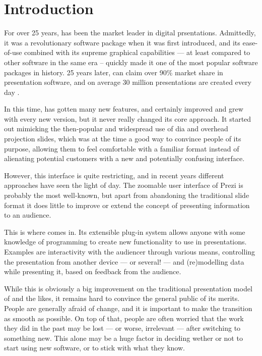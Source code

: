 
 \chapter{Introduction}

  For over 25 years, \ppt* has been the market leader in digital prsentations.
  Admittedly, it was a revolutionary software package when it was first
  introduced, and its ease-of-use combined with its supreme graphical
  capabilities --- at least compared to other software in the same era --
  quickly made it one of the most popular software packages in history. 25
  years later, \ppt* can claim over 90\% market share in presentation software,
  and on average 30 million \ppt presentations are created every day
  \citep{parker-1, drucker-1, bajaj-1}.

  In this time, \ppt* has gotten many new features, and certainly improved and
  grew with every new version, but it never really changed its core approach.
  It started out mimicking the then-popular and widespread use of dia and
  overhead projection slides, which was at the time a good way to convince
  people of its purpose, allowing them to feel comfortable with a familiar
  format instead of alienating potential customers with a new and potentially
  confusing interface.

  However, this interface is quite restricting, and in recent years different
  approaches have seen the light of day. The zoomable user interface of Prezi
  is probably the most well-known, but apart from abandoning the traditional
  slide format it does little to improve or extend the concept of presenting
  information to an audience.

  This is where \mxp comes in. Its extensible plug-in system allows anyone with
  some knowledge of programming to create new functionality to use in
  presentations. Examples are interactivity with the audiencer through various
  means, controlling the presentation from another device --- or several! ---
  and (re)modelling data while presenting it, based on feedback from the
  audience.

  While this is obviously a big improvement on the traditional presentation
  model of \ppt* and the likes, it remains hard to convince the general public
  of its merits. People are generally afraid of change, and it is important to
  make the transition as smooth as possible. On top of that, people are often
  worried that the work they did in the past may be lost --- or worse,
  irrelevant --- after switching to something new. This alone may be a huge
  factor in deciding wether or not to start using new software, or to stick
  with what they know.

